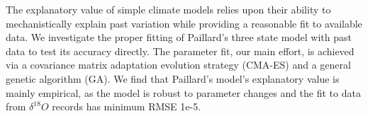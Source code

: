 The explanatory value of simple climate models relies upon their ability to mechanistically explain past variation while providing a reasonable fit to available data.
We investigate the proper fitting of Paillard's three state model with past data to test its accuracy directly.
The parameter fit, our main effort, is achieved via a covariance matrix adaptation evolution strategy (CMA-ES) and a general genetic algorithm (GA).
We find that Paillard's model's explanatory value is mainly empirical, as the model is robust to parameter changes and the fit to data from $\delta ^{18} O$ records has minimum RMSE 1e-5.
